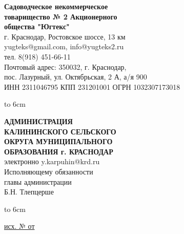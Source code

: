 \noindent\parbox[l][71mm]{80mm}
{
	 \begin{center}
 {\small \textbf{Садоводческое некоммерческое\\ товарищество
 	№  2 Акционерного\\ общества "Югтекс"\\
 }}
 \footnotesize{г. Краснодар, Ростовское шоссе, 13 км\\
 	yugteks@gmail.com, info@yugteks2.ru\\
 	тел. 8(918) 451-66-11\\
 	Почтовый адрес: 350032, г. Краснодар,\\ пос. Лазурный, ул. Октябрьская, 2 А, а/я   900
  }\\
 {ИНН 2311046795 КПП 231201001 ОГРН 1032307173018}
		\end{center}
\hbox to 6cm{ }}\hfill
\parbox[l][71mm]{65mm}
{ \begin{center}
  {\small \textbf{АДМИНИСТРАЦИЯ\\ КАЛИНИНСКОГО
 		СЕЛЬСКОГО\\ ОКРУГА МУНИЦИПАЛЬНОГО\\
 		ОБРАЗОВАНИЯ г. КРАСНОДАР\\
 }}
 \vspace{2mm}
 \footnotesize{электронно y.karpuhin@krd.ru\\
 \vspace{2mm}
 {\normalsize  	 Исполняющему обязанности\\
 	главы администрации\\}
 	 \vspace{6mm}
 	 {\normalsize 	Б.Н. Тлепцерше}
 }\\
 \end{center}
\hbox to 6cm{ }}
\linebreak
\vspace{-10mm}

\underline{исх. №  от } 